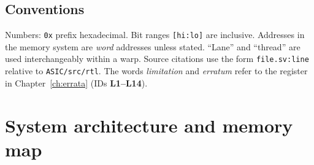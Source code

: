\documentclass[10pt,a4paper]{report}
\begin{document}
\section{Conventions}
Numbers: \texttt{0x} prefix hexadecimal. Bit ranges \texttt{[hi:lo]} are inclusive. Addresses in the memory system are
\emph{word} addresses unless stated. ``Lane'' and ``thread'' are used interchangeably within a warp.
Source citations use the form \texttt{file.sv:line} relative to \texttt{ASIC/src/rtl}.
The words \emph{limitation} and \emph{erratum} refer to the register in Chapter~\ref{ch:errata} (IDs \textbf{L1--L14}).

\chapter{System architecture and memory map}\label{ch:system}
\end{document}
